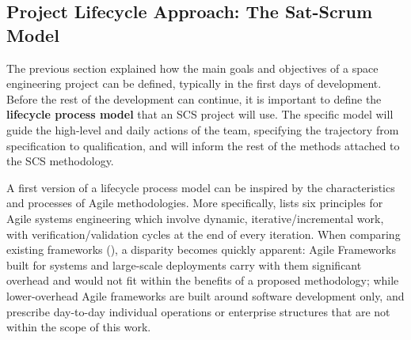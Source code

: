 \documentclass[a4paper,nobib,justified,final]{tufte-book}
\begin{document}
\FloatBarrier
\subsection{Project Lifecycle Approach: The Sat-Scrum Model}
\label{sec:METHODOLOGY_satscrum}



The previous section explained how the main goals and objectives of a space engineering project can be defined, typically in the first days of development. Before the rest of the development can continue, it is important to define the \textbf{lifecycle process model} that an \acs{SCS} project will use. The specific model will guide the high-level and daily actions of the team, specifying the trajectory from specification to qualification, and will inform the rest of the methods attached to the \acs{SCS} methodology.

A first version of a lifecycle process model can be inspired by the characteristics and processes of Agile methodologies. More specifically, \citeauthor{douglassAgileSystemsEngineering2015} \autocite{douglassAgileSystemsEngineering2015} lists six principles for Agile systems engineering%
 which involve dynamic, iterative/incremental work, with verification/validation cycles at the end of every iteration.
When comparing existing frameworks (), a disparity becomes quickly apparent: Agile Frameworks built for systems and large-scale deployments carry with them significant overhead and would not fit within the benefits of a proposed methodology; while lower-overhead Agile frameworks are built around software development only, and prescribe day-to-day individual operations or enterprise structures that are not within the scope of this work.
\end{document}
